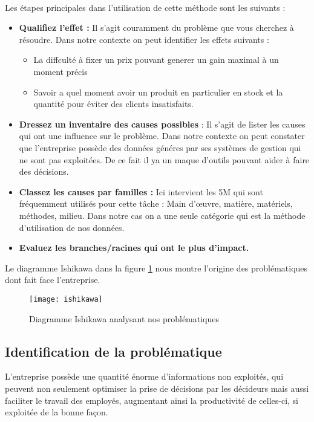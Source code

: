 \paragraph{}
Les étapes principales dans l’utilisation de cette méthode sont les suivants :
\begin{itemize}
    \item \textbf{Qualifiez l'effet :} Il s'agit couramment du problème que vous cherchez à résoudre. Dans notre contexte on peut identifier les effets suivants :
    \begin{itemize}
        \item La diffculté à fixer un prix pouvant generer un gain maximal à un moment précis
        \item Savoir a quel moment avoir un produit en particulier en stock et la quantité pour éviter des clients insatisfaits.
    \end{itemize}
    \item \textbf{Dressez un inventaire des causes possibles }: Il s’agit de lister les causes qui ont une influence sur le problème. Dans notre contexte on peut constater que l'entreprise possède des données généres par ses systèmes de gestion qui ne sont pas exploitées. De ce fait il ya un maque d'outils pouvant aider à faire des décisions.
    \item \textbf{Classez les causes par familles :} Ici intervient les 5M qui sont fréquemment utilisés pour cette tâche : Main d’œuvre, matière, matériels, méthodes, milieu. Dans notre cas on a une seule catégorie qui est la méthode d'utilisation de nos données.
    \item \textbf{Evaluez les branches/racines qui ont le plus d'impact.}
\end{itemize}

Le diagramme Ishikawa dans la figure \ref{fig:ishikawa} nous montre l'origine des problématiques dont fait face l'entreprise.
\begin{figure}[H]
    \centering
    \texttt{[image: ishikawa]}
    \caption{Diagramme Ishikawa analysant nos problématiques}
    \label{fig:ishikawa}
\end{figure}


\subsection{Identification de la problématique}
L’entreprise possède une quantité énorme d’informations non exploités, qui peuvent non seulement optimiser la prise de décisions par les décideurs mais aussi faciliter le travail des employés, augmentant ainsi la productivité de celles-ci, si exploitée de la bonne façon. 

